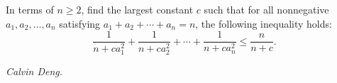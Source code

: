 In terms of $n\ge2$, find the largest constant $c$ such that for all nonnegative $a_1,a_2,\ldots,a_n$ satisfying $a_1+a_2+\cdots+a_n=n$, the following inequality holds:
\[\frac1{n+ca_1^2}+\frac1{n+ca_2^2}+\cdots+\frac1{n+ca_n^2}\le \frac{n}{n+c}.\]

\textit{Calvin Deng.}